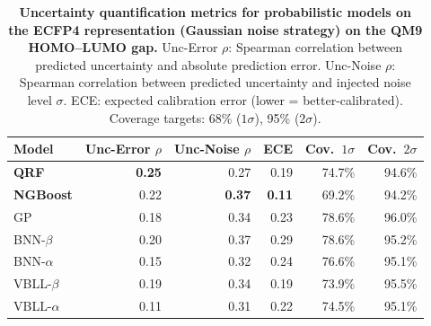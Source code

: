 
\begin{table}[H]
\centering
\caption{\textbf{Uncertainty quantification metrics for probabilistic models on the ECFP4 representation (Gaussian noise strategy) on the QM9 HOMO--LUMO gap.}
Unc-Error $\rho$: Spearman correlation between predicted uncertainty and absolute prediction error. Unc-Noise $\rho$: Spearman correlation between predicted uncertainty and injected noise level $\sigma$. ECE: expected calibration error (lower = better-calibrated). Coverage targets: 68\% ($1\sigma$), 95\% ($2\sigma$).}
\label{app:noise:uncertainty_metrics_ecfp4}
\small
\begin{tabular}{lrrrrr}
\toprule
\textbf{Model} & \textbf{Unc-Error $\rho$} & \textbf{Unc-Noise $\rho$} & \textbf{ECE} & \textbf{Cov.\ $1\sigma$} & \textbf{Cov.\ $2\sigma$} \\
\midrule
\textbf{QRF}     & \textbf{0.25} & 0.27 & 0.19 & 74.7\% & 94.6\% \\
\textbf{NGBoost} & 0.22 & \textbf{0.37} & \textbf{0.11} & 69.2\% & 94.2\% \\
GP               & 0.18 & 0.34 & 0.23 & 78.6\% & 96.0\% \\
BNN-$\beta$      & 0.20 & 0.37 & 0.29 & 78.6\% & 95.2\% \\
BNN-$\alpha$     & 0.15 & 0.32 & 0.24 & 76.6\% & 95.1\% \\
VBLL-$\beta$     & 0.19 & 0.34 & 0.19 & 73.9\% & 95.5\% \\
VBLL-$\alpha$    & 0.11 & 0.31 & 0.22 & 74.5\% & 95.1\% \\
\bottomrule
\end{tabular}
\end{table}
